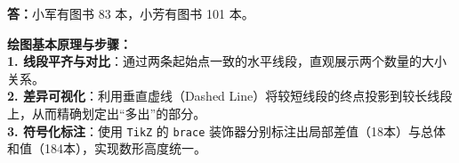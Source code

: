 \vspace{0.2cm}
\noindent\textbf{答：}小军有图书 83 本，小芳有图书 101 本。

\vspace{0.6cm}

{\small\color{blue!70!black}
\textbf{绘图基本原理与步骤：}\\
\textbf{1. 线段平齐与对比}：通过两条起始点一致的水平线段，直观展示两个数量的大小关系。\\
\textbf{2. 差异可视化}：利用垂直虚线（Dashed Line）将较短线段的终点投影到较长线段上，从而精确划定出“多出”的部分。\\
\textbf{3. 符号化标注}：使用 \texttt{TikZ} 的 \texttt{brace} 装饰器分别标注出局部差值（18本）与总体和值（184本），实现数形高度统一。
}

\newpage
